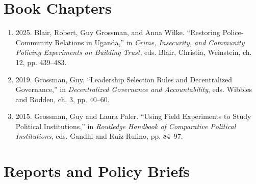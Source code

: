 \documentclass[10pt,a4paper]{article}
\begin{document}
\section{Book Chapters}

\begin{enumerate}[leftmargin=2em, itemsep=3pt, topsep=4pt]
\item \textcolor{secondary}{2025.} Blair, Robert, Guy Grossman, and Anna Wilke. ``Restoring Police-Community Relations in Uganda,'' in \textit{Crime, Insecurity, and Community Policing Experiments on Building Trust}, eds. Blair, Christia, Weinstein, ch. 12, pp. 439--483.
\item \textcolor{secondary}{2019.} Grossman, Guy. ``Leadership Selection Rules and Decentralized Governance,'' in \textit{Decentralized Governance and Accountability}, eds. Wibbles and Rodden, ch. 3, pp. 40--60.
\item \textcolor{secondary}{2015.} Grossman, Guy and Laura Paler. ``Using Field Experiments to Study Political Institutions,'' in \textit{Routledge Handbook of Comparative Political Institutions}, eds. Gandhi and Ruiz-Rufino, pp. 84--97.
\end{enumerate}

\section{Reports and Policy Briefs}
\end{document}
